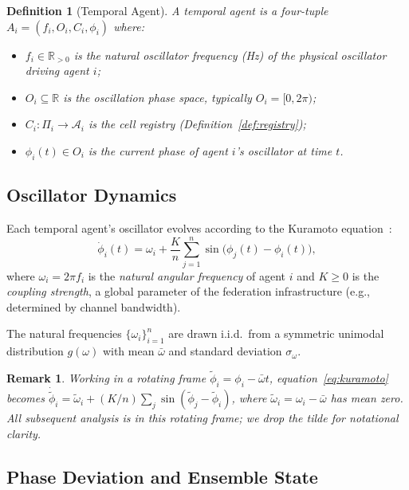 \documentclass[twocolumn,10pt]{article}
\newtheorem{definition}{Definition}[section]
\newtheorem{remark}{Remark}[section]
\newcommand{\sigmaomega}{\sigma_{\omega}}
\begin{document}
\begin{definition}[Temporal Agent]
\label{def:agent}
A \emph{temporal agent} is a four-tuple $A_i = (f_i, O_i, C_i, \phi_i)$
where:
\begin{itemize}[leftmargin=1em]
  \item $f_i \in \mathbb{R}_{>0}$ is the \emph{natural oscillator frequency}
        (Hz) of the physical oscillator driving agent $i$;
  \item $O_i \subseteq \mathbb{R}$ is the \emph{oscillation phase space},
        typically $O_i = [0, 2\pi)$;
  \item $C_i : \Pi_i \to \mathcal{A}_i$ is the cell registry
        (Definition~\ref{def:registry});
  \item $\phi_i(t) \in O_i$ is the \emph{current phase} of agent $i$'s
        oscillator at time $t$.
\end{itemize}
\end{definition}

\subsection{Oscillator Dynamics}

Each temporal agent's oscillator evolves according to the Kuramoto
equation~\cite{Kuramoto1984}:
\begin{equation}
\label{eq:kuramoto}
  \dot{\phi}_i(t) = \omega_i + \frac{K}{n}\sum_{j=1}^{n}
                    \sin\!\bigl(\phi_j(t) - \phi_i(t)\bigr),
\end{equation}
where $\omega_i = 2\pi f_i$ is the \emph{natural angular frequency} of agent
$i$ and $K \geq 0$ is the \emph{coupling strength}, a global parameter of the
federation infrastructure (e.g., determined by channel bandwidth).

The natural frequencies $\{\omega_i\}_{i=1}^{n}$ are drawn i.i.d.\ from a
symmetric unimodal distribution $g(\omega)$ with mean $\bar{\omega}$ and
standard deviation $\sigmaomega$.

\begin{remark}
Working in a rotating frame $\tilde{\phi}_i = \phi_i - \bar{\omega}t$,
equation~\eqref{eq:kuramoto} becomes $\dot{\tilde{\phi}}_i = \tilde{\omega}_i
+ (K/n)\sum_j \sin(\tilde{\phi}_j - \tilde{\phi}_i)$, where
$\tilde{\omega}_i = \omega_i - \bar{\omega}$ has mean zero. All subsequent
analysis is in this rotating frame; we drop the tilde for notational clarity.
\end{remark}

\subsection{Phase Deviation and Ensemble State}
\end{document}

